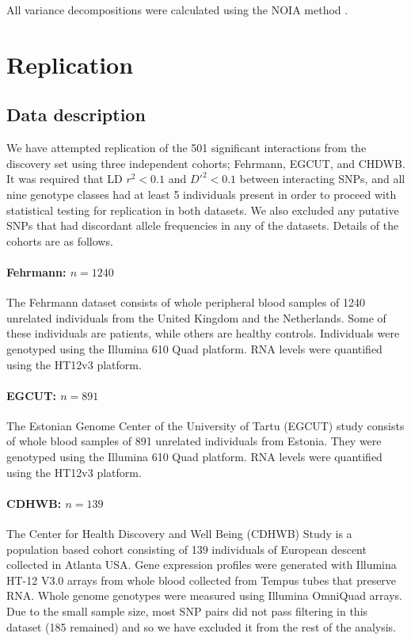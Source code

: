 \documentclass{article}
\begin{document}
All variance decompositions were calculated using the NOIA method \cite{Alvarez-Castro2008}.


\section{Replication}


\subsection{Data description}

We have attempted replication of the 501 significant interactions from the discovery set using three independent cohorts; Fehrmann, EGCUT, and CHDWB. It was required that LD $r^2 < 0.1$ and $D'^{2} < 0.1$ between interacting SNPs, and all nine genotype classes had at least 5 individuals present in order to proceed with statistical testing for replication in both datasets. We also excluded any putative SNPs that had discordant allele frequencies in any of the datasets. Details of the cohorts are as follows.

\paragraph{Fehrmann: $n=1240$}
The Fehrmann dataset \cite{Fehrmann2011} consists of whole peripheral blood samples of 1240 unrelated individuals from the United Kingdom and the Netherlands. Some of these individuals are patients, while others are healthy controls. Individuals were genotyped using the Illumina 610 Quad platform. RNA levels were quantified using the HT12v3 platform.

\paragraph{EGCUT: $n=891$}
The Estonian Genome Center of the University of Tartu (EGCUT) study \cite{Metspalu2004} consists of whole blood samples of 891 unrelated individuals from Estonia. They were genotyped using the Illumina 610 Quad platform. RNA levels were quantified using the HT12v3 platform.

\paragraph{CDHWB: $n=139$}
The Center for Health Discovery and Well Being (CDHWB) Study \cite{Preininger2013} is a population based cohort consisting of 139 individuals of European descent collected in Atlanta USA. Gene expression profiles were generated with Illumina HT-12 V3.0 arrays from whole blood collected from Tempus tubes that preserve RNA. Whole genome genotypes were measured using Illumina OmniQuad arrays. Due to the small sample size, most SNP pairs did not pass filtering in this dataset (185 remained) and so we have excluded it from the rest of the analysis.
\end{document}
